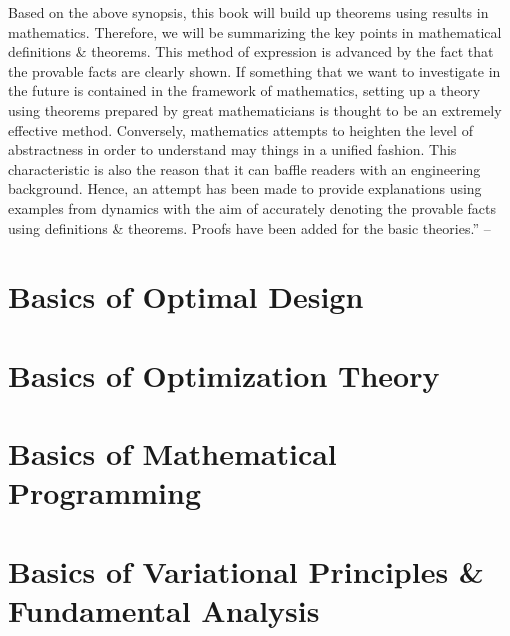 \documentclass[oneside]{book}
\numberwithin{equation}{section}
\begin{document}
Based on the above synopsis, this book will build up theorems using results in mathematics. Therefore, we will be summarizing the key points in mathematical definitions \& theorems. This method of expression is advanced by the fact that the provable facts are clearly shown. If something that we want to investigate in the future is contained in the framework of mathematics, setting up a theory using theorems prepared by great mathematicians is thought to be an extremely effective method. Conversely, mathematics attempts to heighten the level of abstractness in order to understand may things in a unified fashion. This characteristic is also the reason that it can baffle readers with an engineering background. Hence, an attempt has been made to provide explanations using examples from dynamics with the aim of accurately denoting the provable facts using definitions \& theorems. Proofs have been added for the basic theories.''  -- \cite[pp. v--viii]{Azegami2020}


\section{Basics of Optimal Design}


\section{Basics of Optimization Theory}


\section{Basics of Mathematical Programming}


\section{Basics of Variational Principles \& Fundamental Analysis}

\end{document}
